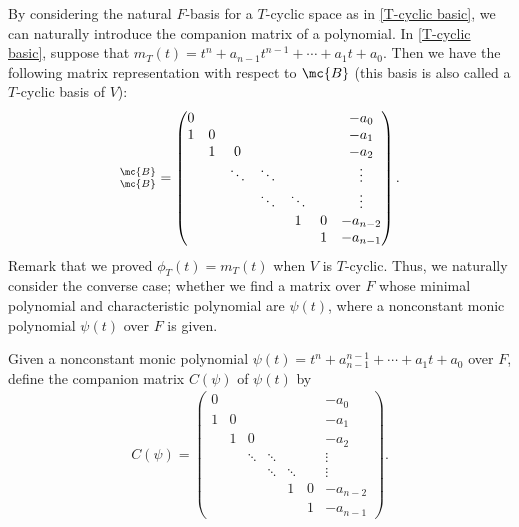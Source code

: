 By considering the natural $F$-basis for a $T$-cyclic space as in \cref{T-cyclic basic}, we can naturally introduce the companion matrix of a polynomial.
In \cref{T-cyclic basic}, suppose that $m_T(t)=t^n+a_{n-1}t^{n-1}+\cdots+a_1t+a_0$.
Then we have the following matrix representation with respect to $\mc{B}$ (this basis is also called a $T$-cyclic basis of $V$):
\begin{align*}
    [T]^{\mc{B}}_{\mc{B}}=\begin{pmatrix}
        0   &       &       &       &       &       &-a_0       \\
        1   &   0   &       &       &       &       &-a_1       \\
            &   1   &   0   &       &       &       &-a_2       \\
            &       &\ddots &\ddots &       &       &\vdots     \\
            &       &       &\ddots &\ddots &       &\vdots     \\
            &       &       &       &   1   &   0   &-a_{n-2}   \\
            &       &       &       &       &   1   &-a_{n-1}
    \end{pmatrix}.
\end{align*}
Remark that we proved $\phi_T(t)=m_T(t)$ when $V$ is $T$-cyclic.
Thus, we naturally consider the converse case; whether we find a matrix over $F$ whose minimal polynomial and characteristic polynomial are $\psi(t)$, where a nonconstant monic polynomial $\psi(t)$ over $F$ is given.
\begin{defi}
    Given a nonconstant monic polynomial $\psi(t)=t^n+a_{n-1}^{n-1}+\cdots+a_1t+a_0$ over $F$, define the companion matrix $C(\psi)$ of $\psi(t)$ by
    \begin{align*}
        C(\psi)=\begin{pmatrix}
            0   &       &       &       &       &       &-a_0       \\
            1   &   0   &       &       &       &       &-a_1       \\
                &   1   &   0   &       &       &       &-a_2       \\
                &       &\ddots &\ddots &       &       &\vdots     \\
                &       &       &\ddots &\ddots &       &\vdots     \\
                &       &       &       &   1   &   0   &-a_{n-2}   \\
                &       &       &       &       &   1   &-a_{n-1}
        \end{pmatrix}.
    \end{align*}
\end{defi}
